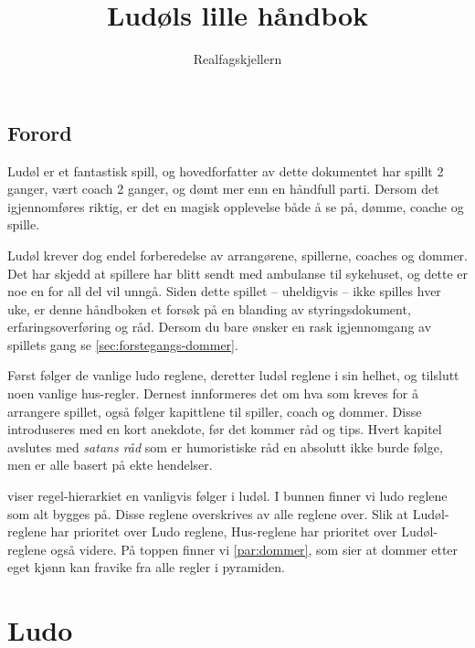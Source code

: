 \documentclass[10pt,a4paper,norsk,openany]{book}
\author{Realfagskjellern}
\title{Ludøls lille håndbok}
\begin{document}
\frontmatter

\maketitle

\section*{Forord}

Ludøl er et fantastisk spill, og hovedforfatter av dette dokumentet har spillt 2
ganger, vært coach 2 ganger, og dømt mer enn en håndfull parti. Dersom det
igjennomføres riktig, er det en magisk opplevelse både å se på, dømme, coache
og spille.  

Ludøl krever dog endel forberedelse av arrangørene, spillerne, coaches og
dommer. Det har skjedd at spillere har blitt sendt med ambulanse til sykehuset,
og dette er noe en for all del vil unngå. Siden dette spillet -- uheldigvis --
ikke spilles hver uke, er denne håndboken et forsøk på en blanding av
styringsdokument, erfaringsoverføring og råd. Dersom du bare ønsker en rask
igjennomgang av spillets gang se \cref{sec:forstegangs-dommer}.

Først følger de vanlige ludo reglene, deretter ludøl reglene i sin helhet, og
tilslutt noen vanlige hus-regler. Dernest innformeres det om hva som kreves for
å arrangere spillet, også følger kapittlene til spiller, coach og dommer. Disse
introduseres med en kort anekdote, før det kommer råd og tips. Hvert kapitel
avslutes med \emph{satans råd} som er humoristiske råd en absolutt ikke burde
følge, men er alle basert på ekte hendelser.

 viser regel-hierarkiet en vanligvis følger i ludøl. I
bunnen finner vi ludo reglene som alt bygges på. Disse reglene overskrives av
alle reglene over. Slik at Ludøl-reglene har prioritet over Ludo reglene,
Hus-reglene har prioritet over Ludøl-reglene også videre. På toppen finner vi
\cref{par:dommer}, som sier at dommer etter eget kjønn kan fravike fra alle regler i
pyramiden.

\begin{figure}[htbp!]
  \centering
  
  \caption{}
  \label{fig:maslows-ludol}
\end{figure}



\tableofcontents


\mainmatter

\chapter{Ludo}
\end{document}
